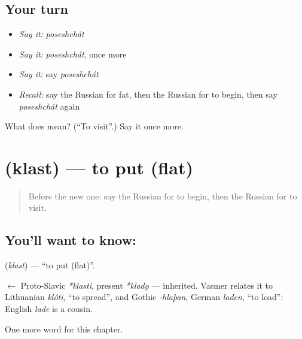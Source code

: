 \subsection*{Your turn}
\begin{itemize}
\raggedright
  \item \emph{Say it:} \emph{poseshchát}
  \item \emph{Say it:} \emph{poseshchát}, once more
  \item \emph{Say it:} say \emph{poseshchát}
  \item \emph{Recall:} say the Russian for fat, then the Russian for to begin, then say \emph{poseshchát} again
\end{itemize}

\begin{tcolorbox}[breakable,colback=teal!4,colframe=teal!35!black,title={Before you move on}]
What does  mean? (\textquotedblleft{}To visit\textquotedblright{}.) Say it once more.
\end{tcolorbox}
\section[\texorpdfstring{\ru{класть} (klast)}{класть (klast)}]{ (klast) — to put (flat)}

\label{lesson:RU-C131-to-put}



\begin{quote}
Before the new one: say the Russian for to begin, then the Russian for to visit.
\end{quote}

\subsection*{You'll want to know: }
\textbf{} (\emph{klast}) — \textquotedblleft{}to put (flat)\textquotedblright{}.

\begin{cousinweb}
\textbf{} $\leftarrow$ Proto-Slavic \emph{*klasti}, present \emph{*kladǫ} — inherited. Vasmer relates it to Lithuanian \emph{klóti}, \textquotedblleft{}to spread\textquotedblright{}, and Gothic \emph{-hlaþan}, German \emph{laden}, \textquotedblleft{}to load\textquotedblright{}: English \emph{lade} is a cousin.
\end{cousinweb}

\begin{grammarlens}[title={What you've built}]
One more word for this chapter.
\end{grammarlens}

